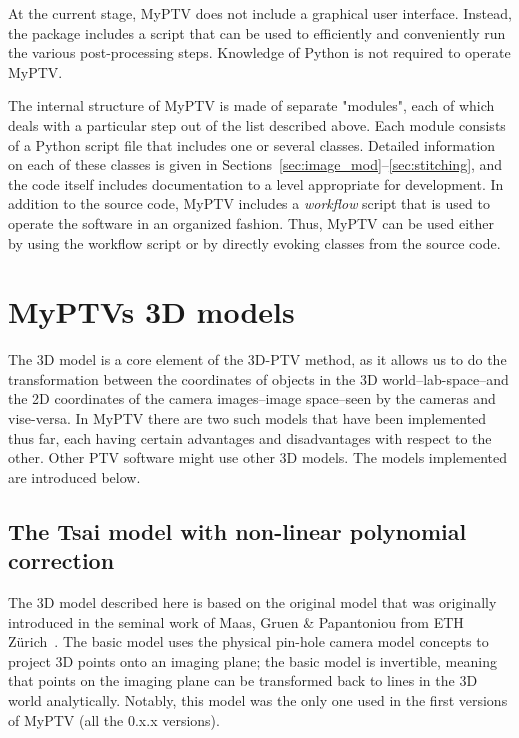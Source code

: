 \documentclass[10pt,a4paper]{article}
\begin{document}
At the current stage, MyPTV does not include a graphical user interface. Instead, the package includes a script that can be used to efficiently and conveniently run the various post-processing steps. Knowledge of Python is not required to operate MyPTV.


The internal structure of MyPTV is made of separate "modules", each of which deals with a particular step out of the list described above. Each module consists of a Python script file that includes one or several classes. Detailed information on each of these classes is given in Sections~\ref{sec:image_mod}--\ref{sec:stitching}, and the code itself includes documentation to a level appropriate for development. In addition to the source code, MyPTV includes a \textit{workflow} script that is used to operate the software in an organized fashion. Thus, MyPTV can be used either by using the workflow script or by directly evoking classes from the source code. 











\clearpage






\section{MyPTVs 3D models}


The 3D model is a core element of the 3D-PTV method, as it allows us to do the transformation between the coordinates of objects in the 3D world--lab-space--and the 2D coordinates of the camera images--image space--seen by the cameras and vise-versa. 
In MyPTV there are two such models that have been implemented thus far, each having certain advantages and disadvantages with respect to the other. Other PTV software might use other 3D models. The models implemented are introduced below.




\subsection{The Tsai model with non-linear polynomial correction}        


The 3D model described here is based on the original model that was originally introduced in the seminal work of Maas, Gruen \& Papantoniou from ETH Z\"{u}rich~\cite{Maas1993}.
The basic model uses the physical pin-hole camera model concepts to project 3D points onto an imaging plane; the basic model is invertible, meaning that points on the imaging plane can be transformed back to lines in the 3D world analytically. Notably, this model was the only one used in the first versions of MyPTV (all the 0.x.x versions).
\end{document}
